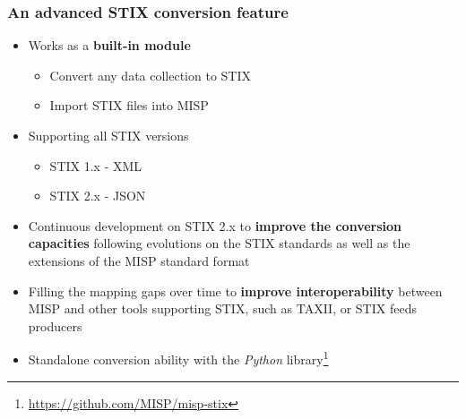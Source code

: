 \begin{frame}
    \frametitle{An advanced STIX conversion feature}
    \begin{itemize}
        \item Works as a \textbf{built-in module}
        \begin{itemize}
            \item Convert any data collection to STIX
            \item Import STIX files into MISP
        \end{itemize}
        \item Supporting all STIX versions
        \begin{itemize}
            \item STIX 1.x - XML
            \item STIX 2.x - JSON
        \end{itemize}
        \item Continuous development on STIX 2.x to \textbf{improve the conversion capacities} following evolutions on the STIX standards as well as the extensions of the MISP standard format
        \item Filling the mapping gaps over time to \textbf{improve interoperability} between MISP and other tools supporting STIX, such as TAXII, or STIX feeds producers
        \item Standalone conversion ability with the \textit{Python} library\footnote{\url{https://github.com/MISP/misp-stix}}
    \end{itemize}
\end{frame}

